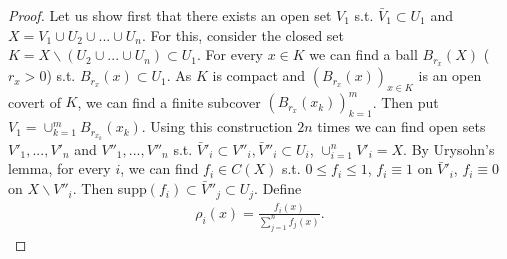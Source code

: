 \ifdetailed
\begin{proof}
    Let us show first that there exists an open set \(V_1\) s.t. \(\bar{V}_1\subset U_1\) and \(X=V_1\cup U_2\cup ... \cup U_n\). For this, consider the closed set \(K=X\backslash\left(U_2\cup ... \cup U_n\right) \subset U_1\). For every \(x\in K\) we can find a ball \(B_{r_x}(X)\) (\(r_x>0\)) s.t. \(B_{r_x}(x)\subset U_1\). As \(K\) is compact and \((B_{r_x}(x))_{x\in K} \) is an open covert of \(K\), we can find a finite subcover \((B_{r_x}(x_k))_{k=1}^{m}\). Then put \(V_1 = \cup_{k=1}^{m}B_{r_{x_k}}(x_k)\). Using this construction \(2n\) times we can find open sets \(V'_1, ..., V'_n\) and \(V''_1, ..., V''_n\) s.t. \(\bar{V}'_i\subset V''_{i}, \bar{V}''_{i}\subset U_i\), \(\cup_{i=1}^{n}V'_i = X\). By Urysohn's lemma, for every \(i\), we can find \(f_i\in C(X)\) s.t. \(0\leq f_i\leq 1\), \(f_i\equiv 1\) on \(\bar{V}'_i\), \(f_i\equiv 0\) on \(X\backslash V''_i\). Then supp\((f_i)\subset \bar{V}''_j\subset U_j\). Define
    \begin{align*}
        \rho_i(x) = \frac{f_i(x)}{\sum_{j=1}^{n}f_j(x)}.
    \end{align*}
\end{proof}
\fi
\ifdetailed
